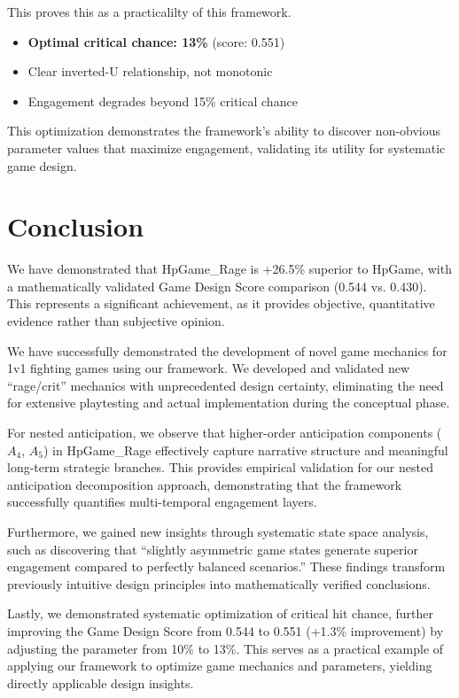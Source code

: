 \documentclass{article}
\begin{document}
This proves this as a practicalilty of this framework. 

\begin{itemize}
\item \textbf{Optimal critical chance: 13\%} (score: 0.551)
\item Clear inverted-U relationship, not monotonic
\item Engagement degrades beyond 15\% critical chance
\end{itemize}


This optimization demonstrates the framework's ability to discover non-obvious parameter values that maximize engagement, validating its utility for systematic game design.

\section{Conclusion}

We have demonstrated that HpGame\_Rage is +26.5\% superior to HpGame, with a mathematically validated Game Design Score comparison (0.544 vs. 0.430). This represents a significant achievement, as it provides objective, quantitative evidence rather than subjective opinion.

We have successfully demonstrated the development of novel game mechanics for 1v1 fighting games using our framework. We developed and validated new ``rage/crit'' mechanics with unprecedented design certainty, eliminating the need for extensive playtesting and actual implementation during the conceptual phase.

For nested anticipation, we observe that higher-order anticipation components ($A_4$, $A_5$) in HpGame\_Rage effectively capture narrative structure and meaningful long-term strategic branches. This provides empirical validation for our nested anticipation decomposition approach, demonstrating that the framework successfully quantifies multi-temporal engagement layers.

Furthermore, we gained new insights through systematic state space analysis, such as discovering that ``slightly asymmetric game states generate superior engagement compared to perfectly balanced scenarios.'' These findings transform previously intuitive design principles into mathematically verified conclusions.

Lastly, we demonstrated systematic optimization of critical hit chance, further improving the Game Design Score from 0.544 to 0.551 (+1.3\% improvement) by adjusting the parameter from 10\% to 13\%. This serves as a practical example of applying our framework to optimize game mechanics and parameters, yielding directly applicable design insights.
\end{document}
